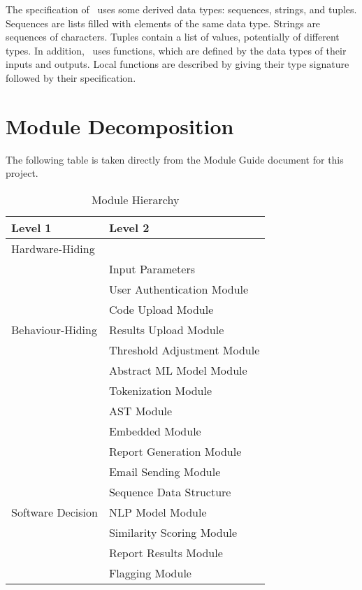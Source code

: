 \documentclass[12pt, titlepage]{article}
\begin{document}
\noindent
The specification of \progname \ uses some derived data types: sequences, strings, and
tuples. Sequences are lists filled with elements of the same data type. Strings
are sequences of characters. Tuples contain a list of values, potentially of
different types. In addition, \progname \ uses functions, which
are defined by the data types of their inputs and outputs. Local functions are
described by giving their type signature followed by their specification.

\section{Module Decomposition}

The following table is taken directly from the Module Guide document for this project.

\begin{table}[h!]
\centering
\begin{tabular}{p{} p{}}
\toprule
\textbf{Level 1} & \textbf{Level 2}\\
\midrule

{Hardware-Hiding} & ~ \\
\midrule

\multirow{7}{0.3\textwidth}{Behaviour-Hiding} & Input Parameters\\
& User Authentication Module \\
& Code Upload Module \\
& Results Upload Module \\
& Threshold Adjustment Module \\
& Abstract ML Model Module \\
& Tokenization Module \\
& AST Module \\
& Embedded Module \\
& Report Generation Module \\
& Email Sending Module \\
\midrule

\multirow{3}{0.3\textwidth}{Software Decision} & {Sequence Data Structure}\\
& NLP Model Module \\
& Similarity Scoring Module \\
& Report Results Module \\
& Flagging Module \\
\bottomrule

\end{tabular}
\caption{Module Hierarchy}
\label{TblMH}
\end{table}
\end{document}
